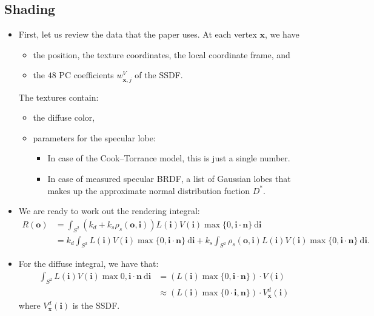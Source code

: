 \documentclass[10pt]{article}
\newcommand{\dee}{\mathrm{d}}
\newcommand{\ve}[1]{\mathbf{#1}}
\begin{document}
  \subsection{Shading}

  \begin{itemize}
    \item First, let us review the data that the paper uses.  At each vertex $\ve{x}$, we have
    \begin{itemize}
      \item the position, the texture coordinates, the local coordinate frame, and
      \item the $48$ PC coefficients $w_{\ve{x},j}^V$ of the SSDF.
    \end{itemize}
    The textures contain:
    \begin{itemize}
      \item the diffuse color,
      \item parameters for the specular lobe:
      \begin{itemize}
        \item In case of the Cook--Torrance model, this is just a single number.
        \item In case of measured specular BRDF, a list of Gaussian lobes that makes up the approximate normal distribution fuction $D^*$.        
      \end{itemize}
    \end{itemize}

    \item We are ready to work out the rendering integral:
    \begin{align*}
      R(\ve{o}) 
      &= \int_{S^2} (k_d + k_s \rho_s(\ve{o}, \ve{i})) L(\ve{i}) V(\ve{i}) \max\{0, \ve{i} \cdot \ve{n} \}\ \dee\ve{i} \\
      &= k_d \int_{S^2} L(\ve{i}) V(\ve{i}) \max\{0, \ve{i} \cdot \ve{n} \}\ \dee\ve{i} + k_s \int_{S^2} \rho_s(\ve{o}, \ve{i}) L(\ve{i}) V(\ve{i}) \max\{0, \ve{i} \cdot \ve{n} \}\ \dee\ve{i}.
    \end{align*}

    \item For the diffuse integral, we have that:
    \begin{align*}
      \int_{S^2} L(\ve{i}) V(\ve{i}) \max{0,\ve{i}\cdot\ve{n}}\ \dee\ve{i}
      &= (L(\ve{i}) \max\{0,\ve{i} \cdot \ve{n} \}) \cdot V(\ve{i}) \\
      &\approx (L(\ve{i}) \max\{0 \cdot \ve{i},\ve{n} \}) \cdot V_\ve{x}^d(\ve{i})
    \end{align*}
    where $V_\ve{x}^d(\ve{i})$ is the SSDF.


\end{itemize}
\end{document}
